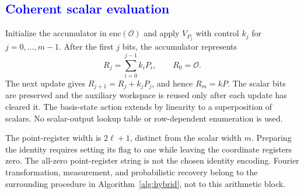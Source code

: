 \subsection{\textcolor{blue}{Coherent scalar evaluation}}
\begin{revision}
Initialize the accumulator in $\mathrm{enc}(\mathcal O)$ and apply
$V_{P_j}$ with control $k_j$ for $j=0,\ldots,m-1$. After the first
$j$ bits, the accumulator represents
\begin{equation}
\label{eq:partial_scalar_accumulation}
R_j=\sum_{i=0}^{j-1}k_iP_i,\qquad R_0=\mathcal O.
\end{equation}
The next update gives $R_{j+1}=R_j+k_jP_j$, and hence $R_m=kP$.
The scalar bits are preserved and the auxiliary workspace is reused
only after each update has cleared it. The basis-state action extends
by linearity to a superposition of scalars. No scalar-output lookup
table or row-dependent enumeration is used.

The point-register width is $2\ell+1$, distinct from the scalar width
$m$. Preparing the identity requires setting its flag to one while
leaving the coordinate registers zero. The all-zero point-register
string is not the chosen identity encoding. Fourier transformation,
measurement, and probabilistic recovery belong to the surrounding
procedure in Algorithm~\ref{alg:hybrid}, not to this arithmetic block.
\end{revision}

